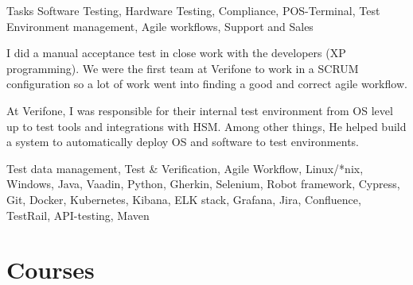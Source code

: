 \documentclass{sobCV}[2015/09/08]
\begin{document}
   {Tasks}{
       Software Testing,
       Hardware Testing,
       Compliance, 
       POS-Terminal,
       Test Environment management,
       Agile workflows,
       Support and Sales
 }{  %
      {
          I did a manual acceptance test in close work with the developers (XP
          programming). We were the first team at Verifone to work in a SCRUM
          configuration so a lot of work went into finding a good and correct
          agile workflow.

          At Verifone, I was responsible for their internal test environment
          from OS level up to test tools and integrations with HSM. Among other
          things, He helped build a system to automatically deploy OS and
          software to test environments.
     }
 }{
       Test data management,
       Test \& Verification,
       Agile Workflow, 
       Linux/*nix, 
       Windows, 
       Java, 
       Vaadin, 
       Python, 
       Gherkin, 
       Selenium, 
       Robot framework,
       Cypress, 
       Git, 
       Docker, 
       Kubernetes, 
       Kibana, 
       ELK stack, 
       Grafana, 
       Jira, 
       Confluence, 
       TestRail, 
       API-testing, 
       Maven 
}
   \section{Courses}
   


\end{document}
